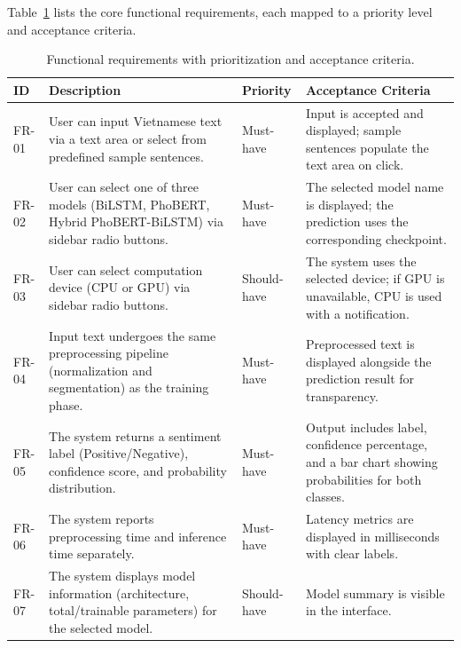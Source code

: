 \documentclass[12pt]{report} %
\begin{document}
Table~\ref{tab:functional-requirements} lists the core functional requirements, each mapped to a priority level and acceptance criteria.

\begin{table}[H]
    \centering
    \caption{Functional requirements with prioritization and acceptance criteria.}
    \label{tab:functional-requirements}
    \begin{tabular}{p{1.2cm}p{3.2cm}p{2.2cm}p{4.2cm}}
        \hline
        \textbf{ID} & \textbf{Description}                                                                                         & \textbf{Priority} & \textbf{Acceptance Criteria}                                                                          \\
        \hline
        FR-01       & User can input Vietnamese text via a text area or select from predefined sample sentences.                   & Must-have         & Input is accepted and displayed; sample sentences populate the text area on click.                    \\
        FR-02       & User can select one of three models (BiLSTM, PhoBERT, Hybrid PhoBERT-BiLSTM) via sidebar radio buttons.      & Must-have         & The selected model name is displayed; the prediction uses the corresponding checkpoint.               \\
        FR-03       & User can select computation device (CPU or GPU) via sidebar radio buttons.                                   & Should-have       & The system uses the selected device; if GPU is unavailable, CPU is used with a notification.          \\
        FR-04       & Input text undergoes the same preprocessing pipeline (normalization and segmentation) as the training phase. & Must-have         & Preprocessed text is displayed alongside the prediction result for transparency.                      \\
        FR-05       & The system returns a sentiment label (Positive/Negative), confidence score, and probability distribution.    & Must-have         & Output includes label, confidence percentage, and a bar chart showing probabilities for both classes. \\
        FR-06       & The system reports preprocessing time and inference time separately.                                         & Must-have         & Latency metrics are displayed in milliseconds with clear labels.                                      \\
        FR-07       & The system displays model information (architecture, total/trainable parameters) for the selected model.     & Should-have       & Model summary is visible in the interface.                                                            \\
        \hline
    \end{tabular}
\end{table}
\end{document}
